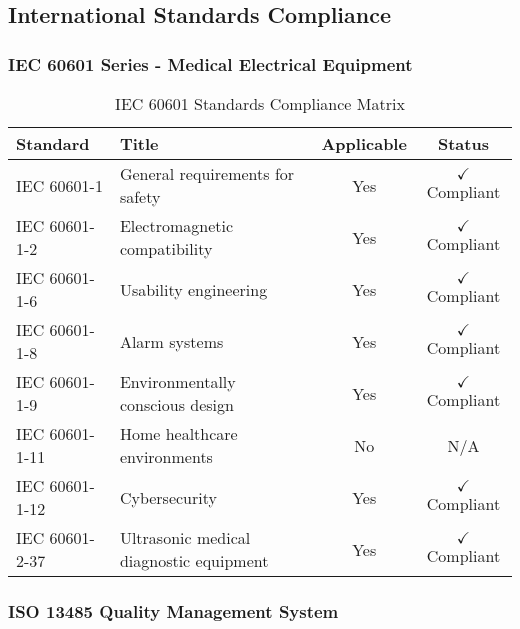 \subsection{International Standards Compliance}

\subsubsection{IEC 60601 Series - Medical Electrical Equipment}

\begin{table}[htbp]
\centering
\caption{IEC 60601 Standards Compliance Matrix}
\label{tab:app-iec-compliance}
\begin{tabular}{|l|l|c|c|}
\hline
\textbf{Standard} & \textbf{Title} & \textbf{Applicable} & \textbf{Status} \\
\hline
IEC 60601-1 & General requirements for safety & Yes & $\checkmark$ Compliant \\
IEC 60601-1-2 & Electromagnetic compatibility & Yes & $\checkmark$ Compliant \\
IEC 60601-1-6 & Usability engineering & Yes & $\checkmark$ Compliant \\
IEC 60601-1-8 & Alarm systems & Yes & $\checkmark$ Compliant \\
IEC 60601-1-9 & Environmentally conscious design & Yes & $\checkmark$ Compliant \\
IEC 60601-1-11 & Home healthcare environments & No & N/A \\
IEC 60601-1-12 & Cybersecurity & Yes & $\checkmark$ Compliant \\
IEC 60601-2-37 & Ultrasonic medical diagnostic equipment & Yes & $\checkmark$ Compliant \\
\hline
\end{tabular}
\end{table}

\subsubsection{ISO 13485 Quality Management System}

